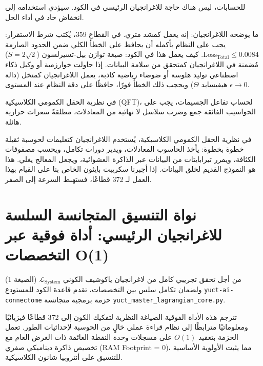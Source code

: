 \documentclass[12pt,a4paper]{article}
\begin{document}
	للحسابات، ليس هناك حاجة للاغرانجيان الرئيسي في الكود. سيؤدي استخدامه إلى انخفاض حاد في أداء الحل.
	
	ما يوضحه اللاغرانجيان: إنه يعمل كمشد متري. في القطاع 359، يُكتب شرط الاستقرار: يجب على النظام بأكمله أن يحافظ على الخطأ الكلي ضمن الحدود الصارمة \(\text{Loss}_{\text{Total}} \le 0.0084\). كيف يعمل هذا في الكود: صيغة توازن بيل-تسيرلسون (\(S = 2\sqrt{2}\)) مُضمنة في اللاغرانجيان كمتحقق من سلامة البيانات. إذا حاولت خوارزمية أو وكيل ذكاء اصطناعي توليد هلوسة أو ضوضاء رياضية كاذبة، يعمل اللاغرانجيان كمنخل (دالة هيفيسايد \(\Theta\)) ويحجب ذلك الخطأ فورًا، حافظًا على دقة النظام عند المستوى \(\epsilon \to 0\).
	
	في نظرية الحقل الكمومي الكلاسيكية (QFT)، لحساب تفاعل الجسيمات، يجب على الحواسيب الفائقة جمع وضرب سلاسل لا نهائية من المعادلات، مطلقةً سعرات حرارية هائلة.
	
	في نظرية الحقل الكمومي الكلاسيكية، يُستخدم اللاغرانجيان كتعليمات لحوسبة ثقيلة خطوة بخطوة: يأخذ الحاسوب المعادلات، ويدير دورات تكامل، ويحسب مصفوفات الكثافة، ويمرر تيرابايتات من البيانات عبر الذاكرة العشوائية، ويجعل المعالج يغلي. هذا هو النموذج القديم لخلق البيانات. إذا أجبرنا سكريبت بايثون الخاص بنا على القيام بهذا العمل لـ 372 قطاعًا، فستهبط السرعة إلى الصفر.
	
	\section{نواة التنسيق المتجانسة السلسة للاغرانجيان الرئيسي: أداة فوقية عبر التخصصات O(1)}
	من أجل تحقق تجريبي كامل من لاغرانجيان ياكوشيف الكوني \(\mathscr{L}_{\text{System}}\) (الصيغة 1) ولضمان تكامل سلس بين التخصصات، تقدم قاعدة الكود للمستودع \texttt{yuct-ai-connectome} حزمة برمجية متجانسة \texttt{yuct\_master\_lagrangian\_core.py}.
	
	تترجم هذه الأداة الفوقية الصياغة النظرية لتفكيك الكون إلى 372 قطاعًا فيزيائيًا ومعلوماتيًا مترابطًا إلى نظام قراءة عملي خالٍ من الحوسبة لإحداثيات الطور. تعمل الحزمة بتعقيد \(O(1)\) على مسجلات وحدة النقطة العائمة ذات الغرض العام مع تخصيص ذاكرة ديناميكي صفري (RAM Footprint = 0)، مما يثبت الأولوية الأساسية للتنسيق على أنتروبيا شانون الكلاسيكية.
	
\end{document}
